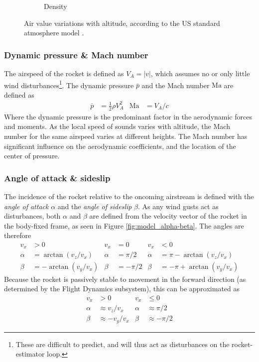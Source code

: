 \begin{figure}[ht]
\begin{subfigure}{0.32\textwidth}
        \caption{Density}
        \label{fig:atmos-density}
    \end{subfigure}
    \caption[US standard atmosphere model]{Air value  variations with altitude, according to the US standard atmosphere model \cite{stengel2004}.}
    \label{fig:atmosphere}
\end{figure}

\subsubsection{Dynamic pressure \& Mach number}
The airspeed of the rocket is defined as $V_A = |v|$, which assumes no or only little wind disturbances\footnote{These are difficult to predict, and will thus act as disturbances on the rocket-estimator loop.}.
The dynamic pressure $\bar p$ and the Mach number $\mathrm{Ma}$ are defined as
\begin{align}
    \bar p &= \frac{1}{2} \rho V_A^2 
    &
    \mathrm{Ma} &= V_A / c
\end{align}
Where the dynamic pressure is the predominant factor in the aerodynamic forces and moments.
As the local speed of sounds varies with altitude, the Mach number for the same airspeed varies at different heights.
The Mach number has significant influence on the aerodynamic coefficients, and the location of the center of pressure.


\subsubsection{Angle of attack \& sideslip}
The incidence of the rocket relative to the oncoming airstream is defined with the \textit{angle of attack} $\alpha$ and the \textit{angle of sideslip} $\beta$.
As any wind gusts act as disturbances, both $\alpha$ and $\beta$ are defined from the velocity vector of the rocket in the body-fixed frame, as seen in Figure \ref{fig:model_alpha-beta}.
The angles are therefore
\begin{align}
    v_x &> 0 & v_x &= 0 & v_x & < 0 \nonumber \\
        \alpha &= \arctan(v_z/v_x)  & \alpha &= \pi/2 & \alpha &= \pi - \arctan(v_z/v_x) \\
        \beta &= - \arctan(v_y/v_x) & \beta &= - \pi/2 & \beta &= - \pi + \arctan(v_y/v_x) 
\end{align}
Because the rocket is passively stable to movement in the forward direction (as determined by the Flight Dynamics subsystem), this can be approximated as
\begin{align}
    v_x &> 0 & v_x &\leq 0 \nonumber \\
    \alpha &\approx v_z/v_x  & \alpha &\approx \pi/2 \\
    \beta &\approx - v_y/v_x & \beta &\approx - \pi/2
\end{align}

